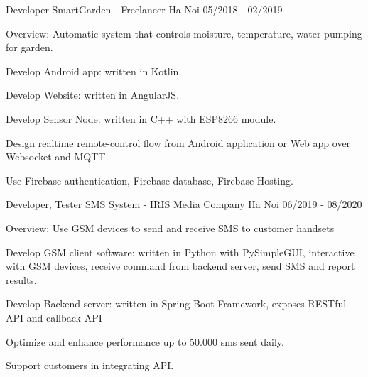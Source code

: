 

\begin{cventries}


    \cventry
    {Developer} %
    {SmartGarden - Freelancer} %
    {Ha Noi} %
    {05/2018 - 02/2019} %
    {
        \begin{cvitems} %
            \item {Overview: Automatic system that controls moisture, temperature, water pumping for garden. }
            \item {Develop Android app: written in Kotlin. }
            \item {Develop Website: written in AngularJS. }
            \item {Develop Sensor Node: written in C++ with ESP8266 module. }
            \item {Design realtime remote-control flow from Android application or Web app over Websocket and MQTT.}
            \item {Use Firebase authentication, Firebase database, Firebase Hosting.}
        \end{cvitems}
    }

    \cventry
    {Developer, Tester} %
    {SMS System - IRIS Media Company} %
    {Ha Noi} %
    {06/2019 - 08/2020} %
    {
        \begin{cvitems} %
            \item {Overview: Use GSM devices to send and receive SMS to customer handsets}
            \item {Develop GSM client software: written in Python with PySimpleGUI, interactive with GSM devices, receive command from backend server, send SMS and report results.}
            \item {Develop Backend server: written in Spring Boot Framework, exposes RESTful API and callback API}
            \item {Optimize and enhance performance up to 50.000 sms sent daily. }
            \item {Support customers in integrating API.}
        \end{cvitems}
    }


\end{cventries}
